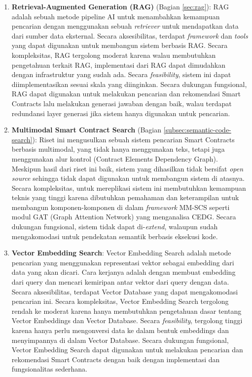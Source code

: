 \begin{enumerate}
	\item \textbf{Retrieval-Augmented Generation (RAG)} (Bagian \ref{sec:rag}): RAG adalah sebuah metode pipeline AI untuk menambahkan kemampuan pencarian dengan menggunakan sebuah \textit{retriever} untuk mendapatkan data dari sumber data eksternal. Secara aksesibilitas, terdapat \textit{framework} dan \textit{tools} yang dapat digunakan untuk membangun sistem berbasis RAG. Secara kompleksitas, RAG tergolong moderat karena walau membutuhkan pengetahuan terkait RAG, implementasi dari RAG dapat dimudahkan dengan infrastruktur yang sudah ada. Secara \textit{feasibility}, sistem ini dapat diimplementasikan sesuai skala yang diinginkan. Secara dukungan fungsional, RAG dapat digunakan untuk melakukan pencarian dan rekomendasi Smart Contracts lalu melakukan generasi jawaban dengan baik, walau terdapat redundansi layer generasi jika sistem hanya digunakan untuk pencarian.

	\item \textbf{Multimodal Smart Contract Search} \parencite{shi2021semantic} (Bagian \ref{subsec:semantic-code-search}): Riset ini mengusulkan sebuah sistem pencarian Smart Contracts berbasis multimodal, yang tidak hanya menggunakan teks, tetapi juga menggunakan alur kontrol (Contract Elements Dependency Graph). Meskipun hasil dari riset ini baik, sistem yang dihasilkan tidak bersifat \textit{open source} sehingga tidak dapat digunakan untuk membangun sistem di atasnya. Secara kompleksitas, untuk mereplikasi sistem ini membutuhkan kemampuan teknis yang tinggi karena dibutuhkan pemahaman dan keterampilan untuk membangun komponen-komponen di dalam \textit{framework} MM-SCS seperti modul GAT (Graph Attention Network) yang menganalisa CEDG. Secara dukungan fungsional, sistem tidak dapat di-\textit{extend}, walaupun sudah mengakomodasi untuk pendekatan semantik berbasis eksekusi kode.

	\item \textbf{Vector Embedding Search}: Vector Embedding Search adalah metode pencarian yang menggunakan representasi vektor sebagai embedding dari data yang akan dicari. Cara kerjanya adalah dengan membuat embedding dari query dan mencari kemiripan antar vektor dari query dengan data. Secara aksesibilitas, terdapat Vector Database yang dapat mengakomodasi pencarian ini. Secara kompleksitas, Vector Embedding Search tergolong rendah ke moderat karena hanya membutuhkan pengetahuan dasar tentang Vector Embeddings dan Vector Database. Secara \textit{feasibility}, tergolong tinggi karena hanya perlu mengonversi data ke dalam bentuk embeddings dan menyimpannya di dalam Vector Database. Secara dukungan fungsional, Vector Embedding Search dapat digunakan untuk melakukan pencarian dan rekomendasi Smart Contracts dengan baik dengan implementasi dan fungsionalitas sederhana.
\end{enumerate}